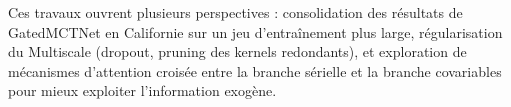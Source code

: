 Ces travaux ouvrent plusieurs perspectives : consolidation des résultats de
GatedMCTNet en Californie sur un jeu d'entraînement plus large, régularisation
du Multiscale (dropout, pruning des kernels redondants), et exploration de
mécanismes d'attention croisée entre la branche sérielle et la branche
covariables pour mieux exploiter l'information exogène.
